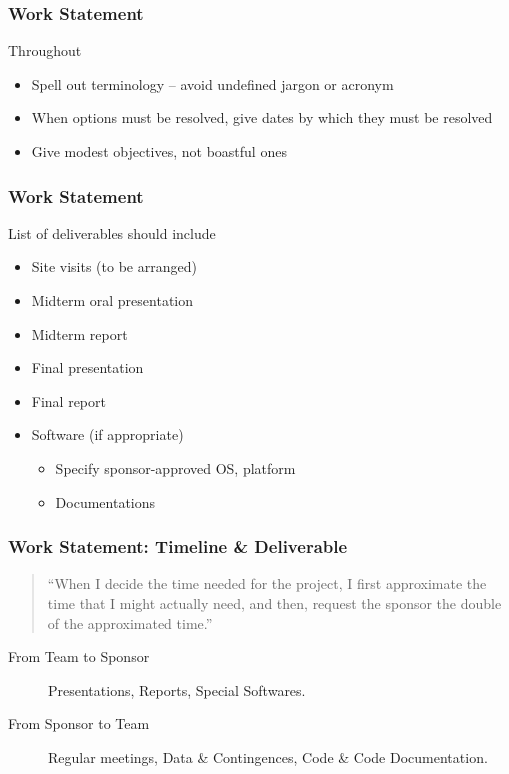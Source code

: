 \begin{frame}
    \frametitle{Work Statement}
    \begin{block}
        {Throughout}
        \begin{itemize}
            \item Spell out terminology -- avoid undefined jargon or acronym
            \item When options must be resolved, give dates by which they must
                be resolved
            \item Give modest objectives, not boastful ones
        \end{itemize}
    \end{block}
\end{frame}

\begin{frame}
    \frametitle{Work Statement}
    \begin{block}
        {List of deliverables should include}
        \begin{itemize}
            \item Site visits (to be arranged)
            \item Midterm oral presentation
            \item Midterm report
            \item Final presentation
            \item Final report
            \item Software (if appropriate) 
                \begin{itemize}
                    \item Specify sponsor-approved OS, platform
                    \item Documentations
                \end{itemize}
        \end{itemize}
    \end{block}
\end{frame}

\begin{frame}[fragile]
    \frametitle{Work Statement: Timeline \& Deliverable}
    \begin{verse}
        ``When I decide the time needed for the project,
        I first approximate the time that I might actually need, 
        and then, request the sponsor the double of the approximated time.''
    \end{verse}
    \vskip0.3in
    \begin{description}
        \item[From Team to Sponsor] Presentations, Reports, Special Softwares.
            \vskip0.5in
        \item[From Sponsor to Team] Regular meetings, Data \& Contingences,
            Code \& Code Documentation.
    \end{description}
\end{frame}

